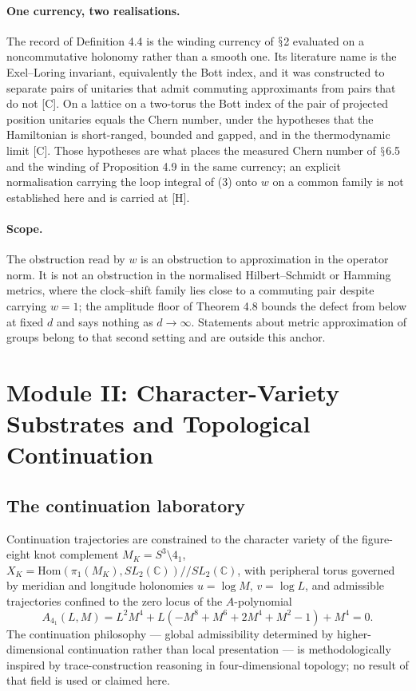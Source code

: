 \documentclass[11pt]{article}
\theoremstyle{definition}
\theoremstyle{plain}
\begin{document}
\paragraph{One currency, two realisations.}
The record of Definition 4.4 is the winding currency of $\mathsection$2 evaluated on a
noncommutative holonomy rather than a smooth one. Its literature name is the
Exel--Loring invariant, equivalently the Bott index, and it was constructed to
separate pairs of unitaries that admit commuting approximants from pairs that do
not [C]. On a lattice on a two-torus the Bott index of the pair of projected
position unitaries equals the Chern number, under the hypotheses that the
Hamiltonian is short-ranged, bounded and gapped, and in the thermodynamic limit
[C]. Those hypotheses are what places the measured Chern number of $\mathsection$6.5 and the
winding of Proposition 4.9 in the same currency; an explicit normalisation carrying
the loop integral of (3) onto $w$ on a common family is not established here and is
carried at [H].

\paragraph{Scope.}
The obstruction read by $w$ is an obstruction to approximation in the operator
norm. It is not an obstruction in the normalised Hilbert--Schmidt or Hamming
metrics, where the clock--shift family lies close to a commuting pair despite
carrying $w = 1$; the amplitude floor of Theorem 4.8 bounds the defect from below
at fixed $d$ and says nothing as $d \to \infty$. Statements about metric
approximation of groups belong to that second setting and are outside this anchor.

\section{Module II: Character-Variety Substrates and Topological Continuation}

\subsection{The continuation laboratory}

Continuation trajectories are constrained to the character variety of the
figure-eight knot complement $M_K = S^3 \setminus 4_1$,
$X_K = \mathrm{Hom}(\pi_1(M_K), SL_2(\mathbb{C}))/\!/SL_2(\mathbb{C})$, with
peripheral torus governed by meridian and longitude holonomies $u = \log M$,
$v = \log L$, and admissible trajectories confined to the zero locus of the
$A$-polynomial
\begin{equation}
A_{4_1}(L,M) = L^2M^4 + L(-M^8 + M^6 + 2M^4 + M^2 - 1) + M^4 = 0.
\end{equation}
The continuation philosophy --- global admissibility determined by
higher-dimensional continuation rather than local presentation --- is
methodologically inspired by trace-construction reasoning in four-dimensional
topology; no result of that field is used or claimed here.
\end{document}
